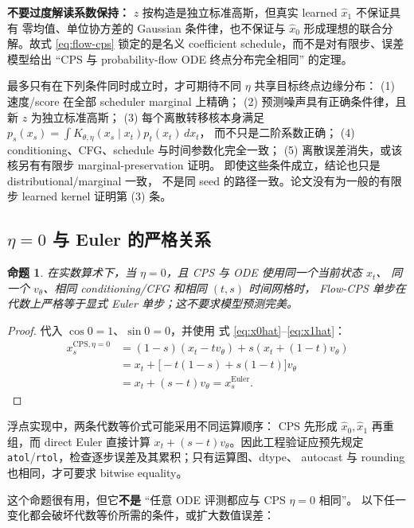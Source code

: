 \documentclass[11pt,a4paper]{article}
\newcommand{\code}[1]{\texttt{#1}}
\newcommand{\warnbox}[1]{%
  \noindent\colorbox{WanLightOrange}{%
    \parbox{\dimexpr\textwidth-2\fboxsep\relax}{\textcolor{WanOrange}{#1}}%
  }%
}
\newtheorem{proposition}{命题}
\begin{document}
\warnbox{\textbf{不要过度解读系数保持：}
$z$ 按构造是独立标准高斯，但真实 learned $\widehat{x}_1$ 不保证具有
零均值、单位协方差的 Gaussian 条件律，也不保证与
$\widehat{x}_0$ 形成理想的联合分解。故式 \eqref{eq:flow-cps}
锁定的是名义 coefficient schedule，而不是对有限步、误差模型给出
``CPS 与 probability-flow ODE 终点分布完全相同'' 的定理。}

最多只有在下列条件同时成立时，才可期待不同 $\eta$ 共享目标终点边缘分布：
(1) 速度/score 在全部 scheduler marginal 上精确；
(2) 预测噪声具有正确条件律，且新 $z$ 为独立标准高斯；
(3) 每个离散转移核本身满足
$p_s(x_s)=\int K_{\theta,\eta}(x_s\mid x_t)p_t(x_t)\,dx_t$，
而不只是二阶系数正确；
(4) conditioning、CFG、schedule 与时间参数化完全一致；
(5) 离散误差消失，或该核另有有限步 marginal-preservation 证明。
即使这些条件成立，结论也只是 distributional/marginal 一致，
不是同 seed 的路径一致。论文没有为一般的有限步 learned kernel 证明第 (3) 条。

\subsection{\texorpdfstring{$\eta=0$}{eta=0} 与 Euler 的严格关系}

\begin{proposition}
在实数算术下，当 $\eta=0$，且 CPS 与 ODE 使用同一个当前状态 $x_t$、
同一个 $v_\theta$、相同 conditioning/CFG 和相同 $(t,s)$ 时间网格时，
Flow-CPS 单步在代数上严格等于显式 Euler 单步；这不要求模型预测完美。
\end{proposition}

\begin{proof}
代入 $\cos 0=1$、$\sin 0=0$，并使用
式 \eqref{eq:x0hat}--\eqref{eq:x1hat}：
\begin{align}
  x_s^{\mathrm{CPS},\eta=0}
  &=(1-s)(x_t-t v_\theta)+s(x_t+(1-t)v_\theta)\\
  &=x_t+\bigl[-t(1-s)+s(1-t)\bigr]v_\theta\\
  &=x_t+(s-t)v_\theta
  =x_s^{\mathrm{Euler}}.
\end{align}
\end{proof}

浮点实现中，两条代数等价式可能采用不同运算顺序：
CPS 先形成 $\widehat{x}_0,\widehat{x}_1$ 再重组，而 direct Euler
直接计算 $x_t+(s-t)v_\theta$。因此工程验证应预先规定
\code{atol}/\code{rtol}，检查逐步误差及其累积；只有运算图、dtype、
autocast 与 rounding 也相同，才可要求 bitwise equality。

这个命题很有用，但它\textbf{不是} ``任意 ODE 评测都应与 CPS $\eta=0$ 相同''。
以下任一变化都会破坏代数等价所需的条件，或扩大数值误差：
\end{document}
